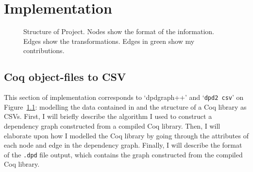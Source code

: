 \chapter{Implementation}\label{chap:impl}



\begin{figure}[t]
\centering

\caption{Structure of Project. Nodes show the format of the information. Edges
  show the transformations. Edges in green  show my contributions.}\label{fig:structure}
\end{figure}

\section{Coq object-files to CSV}

This section of implementation corresponds to `dpdgraph++' and `\texttt{dpd2
csv}' on Figure~\ref{fig:structure}: modelling the data contained in and the
structure of a Coq library as CSVs.  First, I will briefly describe the
algorithm I used to construct a dependency graph constructed from a compiled Coq
library. Then, I will elaborate upon how I modelled the Coq library by going
through the attributes of each node and edge in the dependency graph. Finally, I
will describe the format of the \texttt{.dpd} file output, which contains the
graph constructed from the compiled Coq library.

